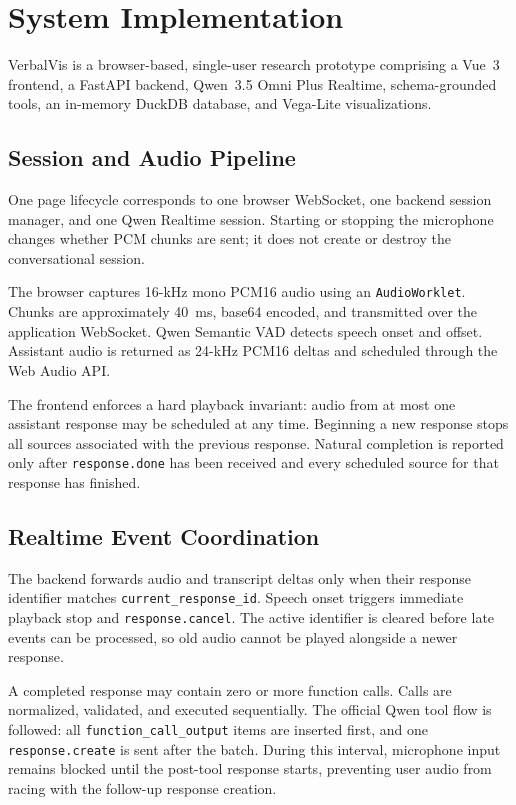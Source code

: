 \documentclass[journal]{IEEEtran}
\begin{document}
\section{System Implementation}
\label{sec:system}

VerbalVis is a browser-based, single-user research prototype comprising a Vue~3 frontend, a FastAPI backend, Qwen~3.5 Omni Plus Realtime, schema-grounded tools, an in-memory DuckDB database, and Vega-Lite visualizations.

\subsection{Session and Audio Pipeline}
\label{sec:audio-pipeline}

One page lifecycle corresponds to one browser WebSocket, one backend session manager, and one Qwen Realtime session. Starting or stopping the microphone changes whether PCM chunks are sent; it does not create or destroy the conversational session.

The browser captures 16-kHz mono PCM16 audio using an \texttt{AudioWorklet}. Chunks are approximately 40~ms, base64 encoded, and transmitted over the application WebSocket. Qwen Semantic VAD detects speech onset and offset. Assistant audio is returned as 24-kHz PCM16 deltas and scheduled through the Web Audio API.

The frontend enforces a hard playback invariant: audio from at most one assistant response may be scheduled at any time. Beginning a new response stops all sources associated with the previous response. Natural completion is reported only after \texttt{response.done} has been received and every scheduled source for that response has finished.

\subsection{Realtime Event Coordination}
\label{sec:realtime-coordination}

The backend forwards audio and transcript deltas only when their response identifier matches \texttt{current\_response\_id}. Speech onset triggers immediate playback stop and \texttt{response.cancel}. The active identifier is cleared before late events can be processed, so old audio cannot be played alongside a newer response.

A completed response may contain zero or more function calls. Calls are normalized, validated, and executed sequentially. The official Qwen tool flow is followed: all \texttt{function\_call\_output} items are inserted first, and one \texttt{response.create} is sent after the batch. During this interval, microphone input remains blocked until the post-tool response starts, preventing user audio from racing with the follow-up response creation.
\end{document}
